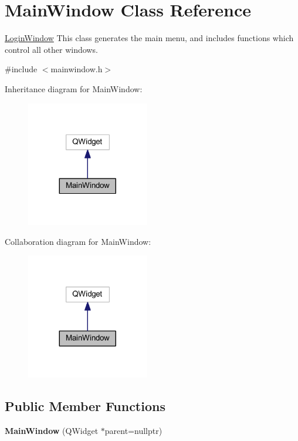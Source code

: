 \hypertarget{class_main_window}{}\section{Main\+Window Class Reference}
\label{class_main_window}


\mbox{\hyperlink{class_login_window}{Login\+Window}} This class generates the main menu, and includes functions which control all other windows.  




{\ttfamily \#include $<$mainwindow.\+h$>$}



Inheritance diagram for Main\+Window\+:\nopagebreak
\begin{figure}[H]
\begin{center}
\leavevmode
\includegraphics[width=152pt]{class_main_window__inherit__graph}
\end{center}
\end{figure}


Collaboration diagram for Main\+Window\+:\nopagebreak
\begin{figure}[H]
\begin{center}
\leavevmode
\includegraphics[width=152pt]{class_main_window__coll__graph}
\end{center}
\end{figure}
\subsection*{Public Member Functions}
\begin{DoxyCompactItemize}
\item 
\mbox{\label{class_main_window_a996c5a2b6f77944776856f08ec30858d}} 
{\bfseries Main\+Window} (Q\+Widget $\ast$parent=nullptr)
\end{DoxyCompactItemize}


